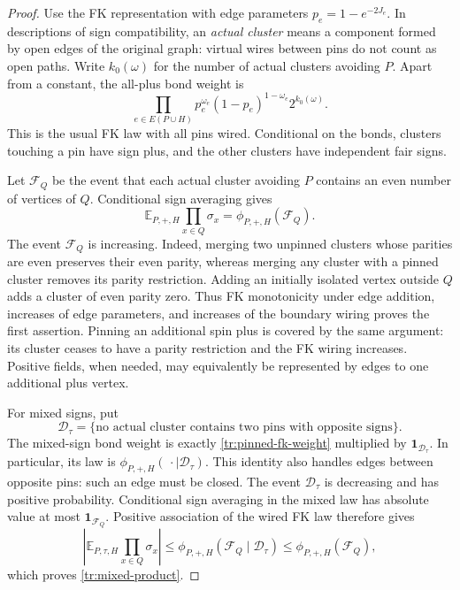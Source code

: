 \documentclass[11pt]{article}
\theoremstyle{definition}
\theoremstyle{remark}
\numberwithin{equation}{section}
\begin{document}
\begin{proof}
Use the FK representation with edge parameters $p_e=1-e^{-2J_e}$. In
descriptions of sign compatibility, an \emph{actual cluster} means a
component formed by open edges of the original graph: virtual wires between
pins do not count as open paths. Write $k_0(\omega)$ for the number of actual
clusters avoiding $P$. Apart from a constant, the all-plus bond weight is
\begin{equation}
\label{tr:pinned-fk-weight}
 \prod_{e\in E(P\cup H)}p_e^{\omega_e}(1-p_e)^{1-\omega_e}
 2^{k_0(\omega)}.
\end{equation}
This is the usual FK law with all pins wired. Conditional on the bonds,
clusters touching a pin have sign plus, and the other clusters have
independent fair signs.

Let $\mathcal F_Q$ be the event that each actual cluster avoiding $P$
contains an even number of vertices of $Q$. Conditional sign averaging gives
\begin{equation}
\label{tr:parity-event}
 \mathbb E_{P,+,H}\prod_{x\in Q}\sigma_x
 =\phi_{P,+,H}(\mathcal F_Q).
\end{equation}
The event $\mathcal F_Q$ is increasing. Indeed, merging two unpinned
clusters whose parities are even preserves their even parity, whereas
merging any cluster with a pinned cluster removes its parity restriction.
Adding an initially isolated vertex outside $Q$ adds a cluster of even
parity zero. Thus FK monotonicity under edge addition, increases of edge
parameters, and increases of the boundary wiring proves the first
assertion. Pinning an additional spin plus is covered by the same argument:
its cluster ceases to have a parity restriction and the FK wiring increases.
Positive fields, when needed, may equivalently be represented by edges to
one additional plus vertex.

For mixed signs, put
\[
 \mathcal D_\tau=
 \{\text{no actual cluster contains two pins with opposite signs}\}.
\]
The mixed-sign bond weight is exactly
\eqref{tr:pinned-fk-weight} multiplied by $\mathbf1_{\mathcal D_\tau}$.
In particular, its law is $\phi_{P,+,H}(\,\cdot\mid\mathcal D_\tau)$.
This identity also handles edges between opposite pins: such an edge must
be closed. The event $\mathcal D_\tau$ is decreasing and has positive
probability. Conditional sign averaging in the mixed law has absolute
value at most $\mathbf1_{\mathcal F_Q}$. Positive association of the wired
FK law therefore gives
\[
 \left|\mathbb E_{P,\tau,H}\prod_{x\in Q}\sigma_x\right|
 \leq \phi_{P,+,H}(\mathcal F_Q\mid\mathcal D_\tau)
 \leq \phi_{P,+,H}(\mathcal F_Q),
\]
which proves \eqref{tr:mixed-product}.


\end{proof}
\end{document}
